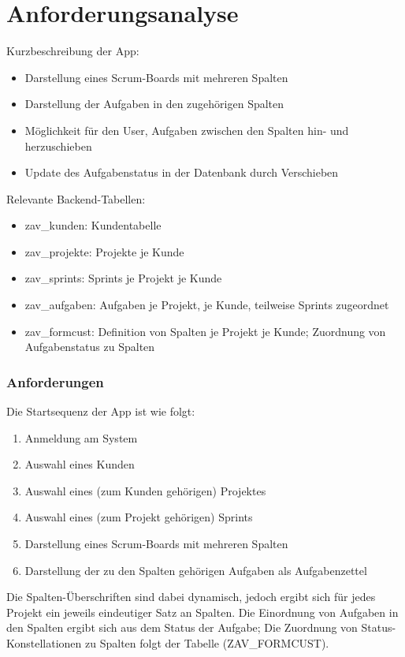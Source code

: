 \chapter{Anforderungsanalyse}
\label{cha:Anforderungsanalyse}

\label{sec:app-spec}
Kurzbeschreibung der App:
\begin{itemize}
\item Darstellung eines Scrum-Boards mit mehreren Spalten
\item Darstellung der Aufgaben in den zugehörigen Spalten
\item Möglichkeit für den User, Aufgaben zwischen den Spalten hin- und herzuschieben
\item Update des Aufgabenstatus  in der Datenbank durch Verschieben
\end{itemize}
\SuperPar
Relevante Backend-Tabellen:
\begin{itemize}
\item zav\_kunden: Kundentabelle
\item zav\_projekte: Projekte je Kunde
\item zav\_sprints: Sprints je Projekt je Kunde
\item zav\_aufgaben: Aufgaben je Projekt, je Kunde, teilweise Sprints zugeordnet
\item zav\_formcust: Definition von Spalten je Projekt je Kunde; Zuordnung von Aufgabenstatus zu Spalten
\end{itemize}


\subsection{Anforderungen}
Die Startsequenz der App ist wie folgt:
\begin{enumerate}
	\item Anmeldung am System
	\item Auswahl eines Kunden
	\item Auswahl eines (zum Kunden gehörigen) Projektes
	\item Auswahl eines (zum Projekt gehörigen) Sprints
	\item Darstellung eines Scrum-Boards mit mehreren Spalten
	\item Darstellung der zu den Spalten gehörigen Aufgaben als Aufgabenzettel
\end{enumerate}
Die Spalten-Überschriften sind dabei dynamisch, jedoch ergibt sich für jedes Projekt ein jeweils eindeutiger Satz an Spalten. Die Einordnung von Aufgaben in den Spalten ergibt sich aus dem Status der Aufgabe; Die Zuordnung von Status-Konstellationen zu Spalten folgt der Tabelle (ZAV\_FORMCUST).

